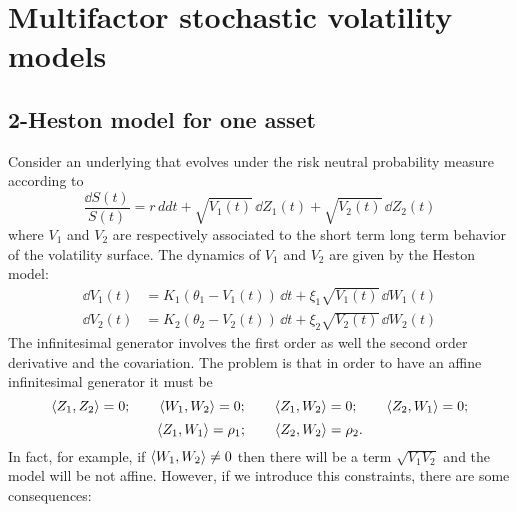 \section{Multifactor stochastic volatility models}
\subsection{2-Heston model for one asset}
Consider an underlying that evolves under the risk neutral probability measure according to
\begin{equation}
    \frac{\dd S(t)}{S(t)} = r\,dd t + \sqrt{V_1(t)}\,\dd Z_1(t) + \sqrt{V_2(t)}\,\dd Z_2(t)
\end{equation}
where $V_1$ and $V_2$ are respectively associated to the short term long term behavior of the volatility surface. The dynamics of $V_1$ and $V_2$ are given by the Heston model:
\begin{align}
    \dd V_1(t) &= K_1(\theta_1 - V_1(t))\,\dd t + \xi_1\sqrt{V_1(t)}\,\dd W_1(t) \\
    \dd V_2(t) &= K_2(\theta_2 - V_2(t))\,\dd t + \xi_2\sqrt{V_2(t)}\,\dd W_2(t)
\end{align}
The infinitesimal generator involves the first order as well the second order derivative and the covariation. The problem is that in order to have an affine infinitesimal generator it must be
\begin{equation*}
    \expval{Z_1,Z_2} = 0; \qquad \expval{W_1,W_2} = 0; \qquad \expval{Z_1,W_2} = 0; \qquad \expval{Z_2,W_1} = 0;
\end{equation*}
\begin{equation*}
    \expval{Z_1,W_1} = \rho_1; \qquad \expval{Z_2,W_2} = \rho_2.
\end{equation*}
In fact, for example, if $\expval{W_1,W_2}\ne 0$ then there will be a term $\sqrt{V_1V_2}$ and the model will be not affine. However, if we introduce this constraints, there are some consequences:
